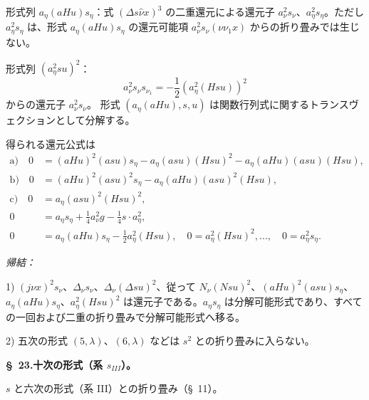 \documentclass[11pt]{jlreq}
\newcommand{\A}{\Delta}
\begin{document}
形式列 $a_\eta(aHu)s_\eta$：式 $(\A s\widehat\nu x)^3$ の二重還元による還元子 $a_\nu^2s_\nu$、$a_\eta^2s_\eta$。ただし $a_\eta^2s_\eta$ は、形式 $a_\eta(aHu)s_\eta$ の還元可能項 $a_\nu^2s_\nu(\nu\nu_1x)$ からの折り畳みでは生じない。

形式列 $(a_\eta^2su)^2$：
\[
a_\nu^2s_\nu s_{\nu_1}=-\frac12(a_\eta^2(Hsu))^2
\]
からの還元子 $a_\nu^2s_\nu$。
形式 $(a_\eta(aHu),s,u)$ は関数行列式に関するトランスヴェクションとして分解する。

得られる還元公式は
\[
\tag{30}
\begin{aligned}
\text{a)}\quad 0&=(aHu)^2(asu)s_\eta-a_\eta(asu)(Hsu)^2-a_\eta(aHu)(asu)(Hsu),\\
\text{b)}\quad 0&=(aHu)^2(asu)^2s_\eta-a_\eta(aHu)(asu)^2(Hsu),\\
\text{c)}\quad 0&=a_\eta(asu)^2(Hsu)^2,\\
0&=a_\eta s_\eta+\frac14a_\nu^2g-\frac14s\cdot a_\eta^2,\\
0&=a_\eta(aHu)s_\eta-\frac12a_\eta^2(Hsu),
\quad 0=a_\eta^2(Hsu)^2,\ldots,
\quad 0=a_\eta^2s_\eta.
\end{aligned}
\]

\noindent\emph{帰結：}

1) $(j\nu x)^2s_\nu$、$\A_\nu s_\nu$、$\A_\nu(\A su)^2$、従って $N_\nu(Nsu)^2$、$(aHu)^2(asu)s_\eta$、$a_\eta(aHu)s_\eta$、$a_\eta^2(Hsu)^2$ は還元子である。$a_\eta s_\eta$ は分解可能形式であり、すべての一回および二重の折り畳みで分解可能形式へ移る。

2) 五次の形式 $(5,\lambda)$、$(6,\lambda)$ などは $s^2$ との折り畳みに入らない。

\begin{center}\textbf{\S\ 23.\quad 十次の形式（系 $s_{III}$）。}\end{center}
$s$ と六次の形式（系 III）との折り畳み（\S\ 11）。
\end{document}

